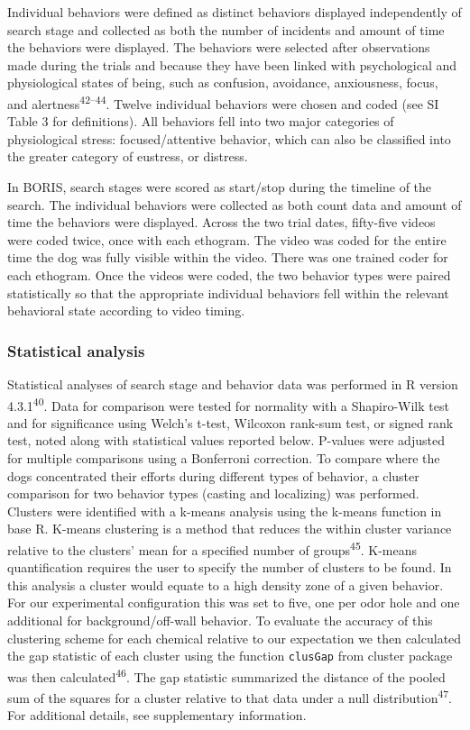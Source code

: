 \documentclass[
]{article}
\begin{document}
Individual behaviors were defined as distinct behaviors displayed independently of search stage and collected as both the number of incidents and amount of time the behaviors were displayed. The behaviors were selected after observations made during the trials and because they have been linked with psychological and physiological states of being, such as confusion, avoidance, anxiousness, focus, and alertness\textsuperscript{42--44}. Twelve individual behaviors were chosen and coded (see SI Table 3 for definitions). All behaviors fell into two major categories of physiological stress: focused/attentive behavior, which can also be classified into the greater category of eustress, or distress.

In BORIS, search stages were scored as start/stop during the timeline of the search. The individual behaviors were collected as both count data and amount of time the behaviors were displayed. Across the two trial dates, fifty-five videos were coded twice, once with each ethogram. The video was coded for the entire time the dog was fully visible within the video. There was one trained coder for each ethogram. Once the videos were coded, the two behavior types were paired statistically so that the appropriate individual behaviors fell within the relevant behavioral state according to video timing.

\hypertarget{statistical-analysis}{%
\subsubsection{Statistical analysis}\label{statistical-analysis}}

Statistical analyses of search stage and behavior data was performed in R version 4.3.1\textsuperscript{40}. Data for comparison were tested for normality with a Shapiro-Wilk test and for significance using Welch's t-test, Wilcoxon rank-sum test, or signed rank test, noted along with statistical values reported below. P-values were adjusted for multiple comparisons using a Bonferroni correction. To compare where the dogs concentrated their efforts during different types of behavior, a cluster comparison for two behavior types (casting and localizing) was performed. Clusters were identified with a k-means analysis using the k-means function in base R. K-means clustering is a method that reduces the within cluster variance relative to the clusters' mean for a specified number of groups\textsuperscript{45}. K-means quantification requires the user to specify the number of clusters to be found. In this analysis a cluster would equate to a high density zone of a given behavior. For our experimental configuration this was set to five, one per odor hole and one additional for background/off-wall behavior. To evaluate the accuracy of this clustering scheme for each chemical relative to our expectation we then calculated the gap statistic of each cluster using the function \texttt{clusGap} from cluster package was then calculated\textsuperscript{46}. The gap statistic summarized the distance of the pooled sum of the squares for a cluster relative to that data under a null distribution\textsuperscript{47}. For additional details, see supplementary information.
\end{document}
